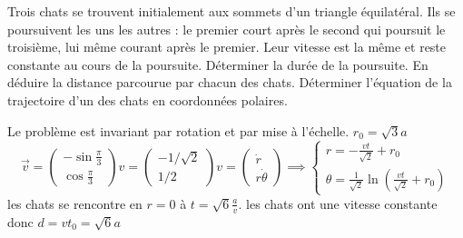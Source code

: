 \begin{Exercise}[title=trois chats et un triangle]
  Trois chats se trouvent initialement aux sommets d'un triangle équilatéral. Ils se poursuivent les uns les autres : le premier court après le second qui poursuit le troisième, lui même courant après le premier. Leur vitesse est la même et reste constante au cours de la poursuite.
\Question Déterminer la durée de la poursuite.
\Question En déduire la distance parcourue par chacun des chats.
\Question Déterminer l'équation de la trajectoire d'un des chats en coordonnées polaires.
\end{Exercise}
\begin{Answer}
  \begin{center}
  \end{center}

  \Question Le problème est invariant par rotation et par mise à l'échelle. $r_0= \sqrt{3} a$
  \[ \vec{v} =
    \begin{pmatrix}
      -\sin \frac{\pi}{3}\\
      \cos \frac{\pi}{3}
   \end{pmatrix}v =
      \begin{pmatrix}
-1/\sqrt{2} \\  1/2
\end{pmatrix} v =
\begin{pmatrix}
\dot{r} \\ r\dot{\theta}
\end{pmatrix}
\implies
\begin{cases}
  r = -\frac{v t}{\sqrt{2}}+r_0 \\
  \theta = \frac{1}{\sqrt{2}} \ln\left(\frac{vt}{\sqrt{2}}+r_0\right)
\end{cases}
\]
\Question les chats se rencontre en $r=0$ à $t=\sqrt{6}\frac{a}{v}$.
\Question les chats ont une vitesse constante donc $d= vt_0 =\sqrt{6}a$
\end{Answer}
